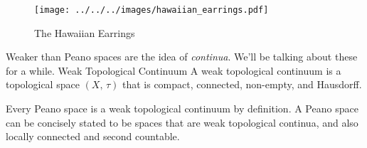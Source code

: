 \documentclass{article}
\theoremstyle{plain}
\theoremstyle{normal}
\newenvironment{example}{%
    \pushQED{\qed}\renewcommand{\qedsymbol}{$\blacksquare$}\examplex%
}{%
    \popQED\endexamplex%
}
\newenvironment{definition}{%
    \pushQED{\qed}\renewcommand{\qedsymbol}{$\blacksquare$}\definitionx%
}{%
    \popQED\enddefinitionx%
}
\begin{document}
        \begin{figure}
            \centering
            \texttt{[image: ../../../images/hawaiian\_earrings.pdf]}
            \caption{The Hawaiian Earrings}
            \label{fig:hawaiian_earrings}
        \end{figure}
        Weaker than Peano spaces are the idea of \textit{continua}. We'll be
        talking about these for a while.
        \begin{definition}{Weak Topological Continuum}
            A weak topological continuum is a topological space $(X,\,\tau)$
            that is compact, connected, non-empty, and Hausdorff.%
        \end{definition}
        \begin{example}
            Every Peano space is a weak topological continuum by definition.
            A Peano space can be concisely stated to be spaces that are
            weak topological continua, and also locally connected and second
            countable.
        \end{example}

    \printindex
\end{document}
